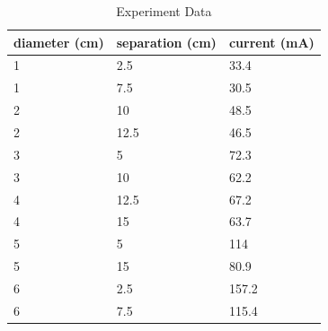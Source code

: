 \documentclass[12pt]{article}
\begin{document}
\begin{table}[h!]
\centering
\caption{Experiment Data}
\label{my-label}
\begin{tabular}{lll}
diameter (cm) & separation (cm) & current (mA) \\
\hline
1             & 2.5             & 33.4         \\
1             & 7.5             & 30.5         \\
2             & 10              & 48.5         \\
2             & 12.5            & 46.5         \\
3             & 5               & 72.3         \\
3             & 10              & 62.2         \\
4             & 12.5            & 67.2         \\
4             & 15              & 63.7         \\
5             & 5               & 114          \\
5             & 15              & 80.9         \\
6             & 2.5             & 157.2        \\
6             & 7.5             & 115.4       
\end{tabular}
\end{table}
\end{document}
